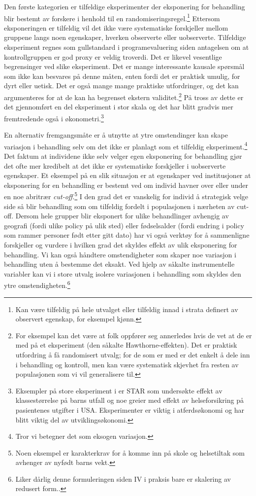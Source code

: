 Den første kategorien er tilfeldige eksperimenter der eksponering for behandling blir bestemt av forskere i henhold til en randomiseringsregel.\footnote{Kan være tilfeldig på hele utvalget eller tilfeldig innad i strata definert av observert egenskap, for eksempel kjønn.} Ettersom eksponeringen er tilfeldig vil det ikke være systematiske forskjeller mellom gruppene langs noen egenskaper, hverken observerte eller uobserverte. Tilfeldige eksperiment regnes som gullstandard i programevaluering siden antagelsen om at kontrollgruppen er god proxy er veldig troverdi. Det er likevel vesentlige begrensinger ved slike eksperiment. Det er mange interessante kausale spørsmål som ikke kan besvares på denne måten, enten fordi det er praktisk umulig, for dyrt eller uetisk. Det er også mange mange praktiske utfordringer, og det kan argumenteres for at de kan ha begrenset ekstern validitet.\footnote{For eksempel kan det være at folk oppfører seg annerledes hvis de vet at de er med på et eksperiment (den såkalte Hawthorne-effekten). Det er praktisk utfordring å få randomisert utvalg; for de som er med er det enkelt å dele inn i behandling og kontroll, men kan være systematisk skjevhet fra resten av populasjonen som vi vil generalisere til.} På tross av dette er det gjennomført en del eksperiment i stor skala og det har blitt gradvis mer fremtredende også i økonometri.\footnote{Eksempler på store eksperiment i er STAR som undersøkte effekt av klassestørrelse på barns utfall og noe greier med effekt av helseforsikring på pasientenes utgifter i USA. Eksperimenter er viktig i atferdsøkonomi og har blitt viktig del av utviklingsøkonomi.}

En alternativ fremgangsmåte er å utnytte at ytre omstendinger kan skape variasjon i behandling selv om det ikke er planlagt som et tilfeldig eksperiment.\footnote{Tror vi betegner det som eksogen variasjon.} Det faktum at individene ikke selv velger egen eksponering for behandling gjør det ofte mer kredibelt at det ikke er systematiske forskjeller i uobserverte egenskaper. Et eksempel på en slik situasjon er at egenskaper ved institusjoner at eksponering for en behandling er bestemt ved om individ havner over eller under en noe abritrær \textit{cut-off}.\footnote{Noen eksempel er karakterkrav for å komme inn på skole og helsetiltak som avhenger av nyfødt barns vekt.} I den grad det er vanskelig for individ å strategisk velge side så blir behandling som om tilfeldig fordelt i populasjonen i nærheten av cut-off. Dersom hele grupper blir eksponert for ulike behandlinger avhengig av geografi (fordi ulike policy på ulik sted) eller fødselsalder (fordi endring i policy som rammer personer født etter gitt dato) har vi også verktøy for å sammenligne forskjeller og vurdere i hvilken grad det skyldes effekt av ulik eksponering for behandling. Vi kan også håndtere omstendigheter som skaper noe variasjon i behandling uten å bestemme det eksakt. Ved hjelp av såkalte instrumentelle variabler kan vi i store utvalg isolere variasjonen i behandling som skyldes den ytre omstendigheten.\footnote{Liker dårlig denne formuleringen siden IV i praksis bare er skalering av redusert form..}

